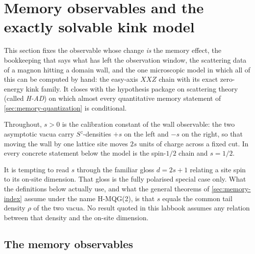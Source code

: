
\section{Memory observables and the exactly solvable kink model}
\label{sec:kink-model}

This section fixes the observable whose change \emph{is} the memory effect, the
bookkeeping that says what has left the observation window, the scattering data
of a magnon hitting a domain wall, and the one microscopic model in which all of
this can be computed by hand: the easy-axis $XXZ$ chain with its exact
zero-energy kink family. It closes with the hypothesis package on scattering
theory (called \emph{H-AD}) on which almost every quantitative memory statement
of \cref{sec:memory-quantization} is conditional.

Throughout, $s>0$ is the calibration constant of the wall observable: the two
asymptotic vacua carry $S^z$-densities $+s$ on the left and $-s$ on the right,
so that moving the wall by one lattice site moves $2s$ units of charge across a
fixed cut. In every concrete statement below the model is the spin-$1/2$ chain
and $s=1/2$.

\begin{remark}
\label{rem:s-fence}
It is tempting to read $s$ through the familiar gloss $d=2s+1$ relating a site
spin to its on-site dimension. That gloss is the fully polarised special case
only. What the definitions below actually use, and what the general theorems of
\cref{sec:memory-index} assume under the name H-MQG(2), is that $s$ equals the
common tail density $\rho$ of the two vacua. No result quoted in this labbook
assumes any relation between that density and the on-site dimension.
\end{remark}

\subsection{The memory observables}

